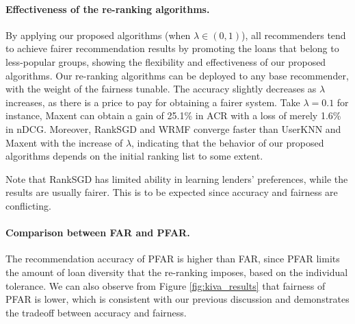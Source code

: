 \paragraph{Effectiveness of the re-ranking algorithms.} By applying our proposed algorithms (when $\lambda\in(0,1)$), all recommenders tend to achieve fairer recommendation results by promoting the loans that belong to less-popular groups, showing the flexibility and effectiveness of our proposed algorithms. Our re-ranking algorithms can be deployed to any base recommender, with the weight of the fairness tunable. The accuracy slightly decreases as $\lambda$ increases, as there is a price to pay for obtaining a fairer system. Take $\lambda=0.1$ for instance, Maxent can obtain a gain of 25.1\% in ACR with a loss of merely 1.6\% in nDCG. Moreover, RankSGD and WRMF converge faster than UserKNN and Maxent with the increase of $\lambda$, indicating that the behavior of our proposed algorithms depends on the initial ranking list to some extent. 

Note that RankSGD has limited ability in learning lenders' preferences, while the results are usually fairer. This is to be expected since accuracy and fairness are conflicting.

\paragraph{Comparison between FAR and PFAR.} The recommendation accuracy of PFAR is higher than FAR, since PFAR limits the amount of loan diversity that the re-ranking imposes, based on the individual tolerance. We can also observe from Figure \ref{fig:kiva_results} that fairness of PFAR is lower, which is consistent with our previous discussion and demonstrates the tradeoff between accuracy and fairness.



